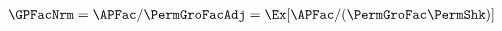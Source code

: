   \begin{equation}\begin{gathered}\begin{aligned}
    \GPFacNrm  & = \APFac/\PermGroFacAdj = \Ex[\APFac/(\PermGroFac\PermShk)]  \label{eq:GPFacNrmDefn}
  \end{aligned}\end{gathered}\end{equation}
